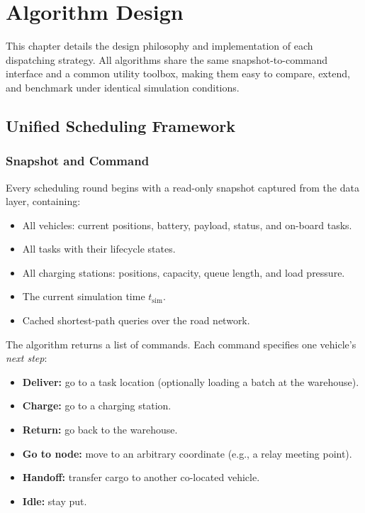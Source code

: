 
\chapter{Algorithm Design}

This chapter details the design philosophy and implementation of each dispatching strategy. All algorithms share the same snapshot-to-command interface and a common utility toolbox, making them easy to compare, extend, and benchmark under identical simulation conditions.

\section{Unified Scheduling Framework}

\subsection{Snapshot and Command}

Every scheduling round begins with a read-only snapshot captured from the data layer, containing:
\begin{itemize}[leftmargin=4em]
    \item All vehicles: current positions, battery, payload, status, and on-board tasks.
    \item All tasks with their lifecycle states.
    \item All charging stations: positions, capacity, queue length, and load pressure.
    \item The current simulation time $t_{\text{sim}}$.
    \item Cached shortest-path queries over the road network.
\end{itemize}

The algorithm returns a list of commands. Each command specifies one vehicle's \emph{next step}:
\begin{itemize}[leftmargin=4em]
    \item \textbf{Deliver:} go to a task location (optionally loading a batch at the warehouse).
    \item \textbf{Charge:} go to a charging station.
    \item \textbf{Return:} go back to the warehouse.
    \item \textbf{Go to node:} move to an arbitrary coordinate (e.g., a relay meeting point).
    \item \textbf{Handoff:} transfer cargo to another co-located vehicle.
    \item \textbf{Idle:} stay put.
\end{itemize}

